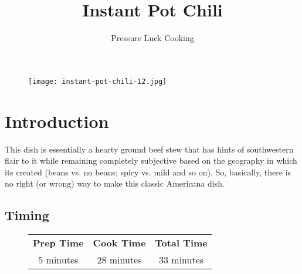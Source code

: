 \documentclass{article}
\title{Instant Pot Chili}
\author{Pressure Luck Cooking}
\begin{document}
\maketitle

\begin{figure}[H]
    \centering
    \texttt{[image: instant-pot-chili-12.jpg]}
\end{figure}

\section{Introduction}

This dish is essentially a hearty ground beef stew that has hints of southwestern flair to it while remaining completely subjective based on the geography in which its created (beans vs. no beans; spicy vs. mild and so on). So, basically, there is no right (or wrong) way to make this classic Americana dish.

\subsection{Timing}
\begin{figure}[H]
\centering
\begin{tabular}[t]{c c c}
\toprule
\textbf{Prep Time} & \textbf{Cook Time} & \textbf{Total Time} \\ 
5 minutes & 28 minutes & 33 minutes \\
\bottomrule
\end{tabular}
\end{figure}
\end{document}
